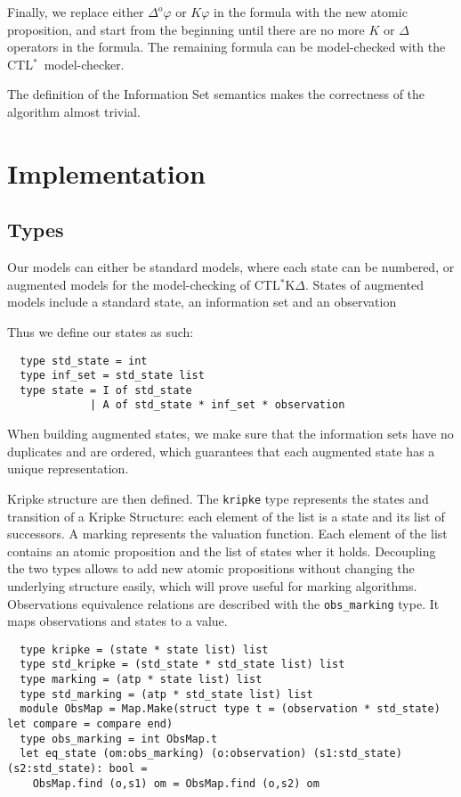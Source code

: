 \documentclass{acmart}
\def\ctls{CTL$^{*}$}
\def\ctlskd{CTL$^{*}$K$\Delta$}
\def\K{\mathit{K}}
\def\D#1{\Delta^{#1}}
\begin{document}
Finally, we replace either $\D{o}\varphi$ or $\K\varphi$ in the formula with the new atomic proposition, and start from the beginning until there are no more $\K$ or $\Delta$ operators in the formula. The remaining formula can be model-checked with the \ctls\ model-checker.

The definition of the Information Set semantics makes the correctness of the algorithm almost trivial.

\section{Implementation}

\subsection{Types}
Our models can either be standard models, where each state can be numbered, or augmented models for the model-checking of \ctlskd.
States of augmented models include a standard state, an information set and an observation

Thus we define our states as such:
\begin{lstlisting}
  type std_state = int
  type inf_set = std_state list
  type state = I of std_state
             | A of std_state * inf_set * observation
\end{lstlisting}

When building augmented states, we make sure that the information sets have no duplicates and are ordered, which guarantees that each augmented state has a unique representation.

Kripke structure are then defined. The \texttt{kripke} type represents the states and transition of a Kripke Structure: each element of the list is a state and its list of successors.
A marking represents the valuation function. Each element of the list contains an atomic proposition and the list of states wher it holds.
Decoupling the two types allows to add new atomic propositions without changing the underlying structure easily, which will prove useful for marking algorithms.
Observations equivalence relations are described with the \texttt{obs\_marking} type. It maps observations and states to a value. 

\begin{lstlisting}
  type kripke = (state * state list) list
  type std_kripke = (std_state * std_state list) list
  type marking = (atp * state list) list
  type std_marking = (atp * std_state list) list
  module ObsMap = Map.Make(struct type t = (observation * std_state) let compare = compare end)
  type obs_marking = int ObsMap.t
  let eq_state (om:obs_marking) (o:observation) (s1:std_state) (s2:std_state): bool =
    ObsMap.find (o,s1) om = ObsMap.find (o,s2) om
\end{lstlisting}
\end{document}
